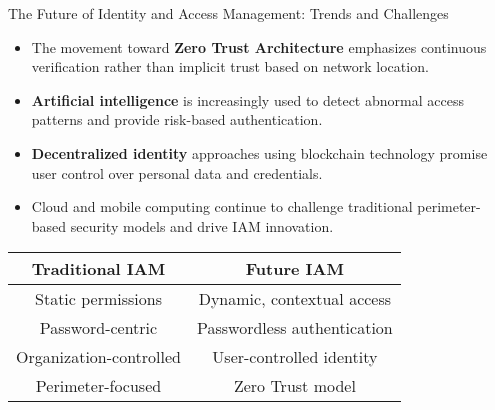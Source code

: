 \documentclass{beamer}
\begin{document}
\begin{frame}{The Future of Identity and Access Management: Trends and Challenges}
    \begin{itemize}
        \item The movement toward \textbf{Zero Trust Architecture} emphasizes continuous verification rather than implicit trust based on network location.
        \item \textbf{Artificial intelligence} is increasingly used to detect abnormal access patterns and provide risk-based authentication.
        \item \textbf{Decentralized identity} approaches using blockchain technology promise user control over personal data and credentials.
        \item Cloud and mobile computing continue to challenge traditional perimeter-based security models and drive IAM innovation.
    \end{itemize}
    
    \begin{center}
        \begin{tabular}{|c|c|}
            \hline
            \textbf{Traditional IAM} & \textbf{Future IAM} \\
            \hline
            Static permissions & Dynamic, contextual access \\
            Password-centric & Passwordless authentication \\
            Organization-controlled & User-controlled identity \\
            Perimeter-focused & Zero Trust model \\
            \hline
        \end{tabular}
    \end{center}
\end{frame}
\end{document}
